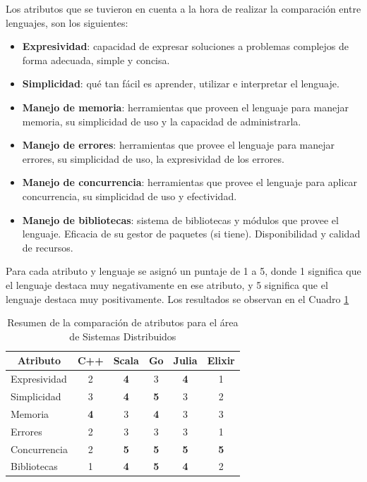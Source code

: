 \documentclass[11pt]{article}
\newcommand{\badMetric}[1]{{\color{BrickRed}#1}}
\newcommand{\goodMetric}[1]{{\textbf{#1}}}
\begin{document}
Los atributos que se tuvieron en cuenta a la hora de realizar la comparación entre lenguajes, son los siguientes:

\begin{itemize}
    \item \textbf{Expresividad}: capacidad de expresar soluciones a problemas complejos de forma adecuada, simple y concisa.
    \item \textbf{Simplicidad}: qué tan fácil es aprender, utilizar e interpretar el lenguaje.
    \item \textbf{Manejo de memoria}: herramientas que proveen el lenguaje para manejar memoria, su simplicidad de uso y la capacidad de administrarla.
    \item \textbf{Manejo de errores}: herramientas que provee el lenguaje para manejar errores, su simplicidad de uso, la expresividad de los errores.
    \item \textbf{Manejo de concurrencia}: herramientas que provee el lenguaje para aplicar concurrencia, su simplicidad de uso y efectividad.
    \item \textbf{Manejo de bibliotecas}: sistema de bibliotecas y módulos que provee el lenguaje. Eficacia de su gestor de paquetes (si tiene). Disponibilidad y calidad de recursos.
\end{itemize}

Para cada atributo y lenguaje se asignó un puntaje de 1 a 5, donde 1 significa que el lenguaje destaca muy negativamente en ese atributo, y 5 significa que el lenguaje destaca muy positivamente. Los resultados se observan en el Cuadro \ref{tab:sis_dist:experiences}

\begin{table}[h]
\centering
\begin{tabular}{|l|c|c|c|c|c|}
\hline
\multicolumn{1}{|c|}{Atributo} & C++ & Scala & Go & Julia & Elixir \\ \hline
Expresividad & \badMetric{2} & \goodMetric{4} & 3 & \goodMetric{4} & \badMetric{1} \\ \hline
Simplicidad & 3 & \goodMetric{4} & \goodMetric{5} & 3 & \badMetric{2} \\ \hline
Memoria & \goodMetric{4} & 3 & \goodMetric{4} & 3 & 3 \\ \hline
Errores & \badMetric{2} & 3 & 3 & 3 & \badMetric{1} \\ \hline
Concurrencia & \badMetric{2} & \goodMetric{5} & \goodMetric{5} & \goodMetric{5} & \goodMetric{5} \\ \hline
Bibliotecas & \badMetric{1} & \goodMetric{4} & \goodMetric{5} & \goodMetric{4} & \badMetric{2} \\ \hline
\end{tabular}
\caption{Resumen de la comparación de atributos para el área de Sistemas Distribuidos}
\label{tab:sis_dist:experiences}
\end{table}
\end{document}
